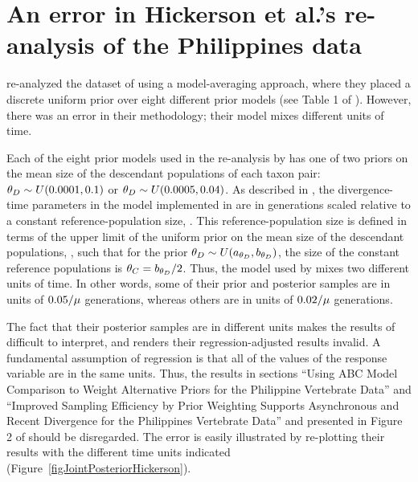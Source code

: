 \section{An error in Hickerson et al.'s re-analysis of the Philippines data}
\citet{Hickerson2013} re-analyzed the dataset of \citet{Oaks2012} using a
model-averaging approach, where they placed a discrete uniform prior over eight
different prior models (see Table 1 of \citet{Hickerson2013}).
However, there was an error in their methodology; their model mixes different
units of time.

Each of the eight prior models used in the re-analysis by \citet{Hickerson2013}
has one of two priors on the mean size of the descendant populations of each
taxon pair:
$\meanDescendantTheta{} \sim U(0.0001, 0.1)$ or
$\meanDescendantTheta{} \sim U(0.0005, 0.04)$.
As described in \citet{Oaks2012}, the divergence-time parameters in the model
implemented in \msb are in generations scaled relative to a constant
reference-population size, .
This reference-population size is defined in terms of the upper limit of the
uniform prior on the mean size of the descendant populations,
\meanDescendantTheta{}, such that for the prior $\meanDescendantTheta{} \sim
U(\uniformMin{\meanDescendantTheta{}},\uniformMax{\meanDescendantTheta{}})$,
the size of the constant reference populations is $\myTheta{C} =
\uniformMax{\meanDescendantTheta{}}/2$.
Thus, the model used by \citet{Hickerson2013} mixes two different units of
time.
In other words, some of their prior and posterior samples are in units of
$0.05/\mu$ generations, whereas others are in units of
$0.02/\mu$ generations.

The fact that their posterior samples are in different units makes the results
of \citet{Hickerson2013} difficult to interpret, and renders their
regression-adjusted results invalid.
A fundamental assumption of regression is that all of the values of the
response variable are in the same units.
Thus, the results in sections ``Using ABC Model Comparison to Weight
Alternative Priors for the Philippine Vertebrate Data'' and ``Improved Sampling
Efficiency by Prior Weighting Supports Asynchronous and Recent Divergence for
the Philippines Vertebrate Data'' and presented in Figure 2 of
\citet{Hickerson2013} should be disregarded.
The error is easily illustrated by re-plotting their results with the different
time units indicated (Figure~\ref{figJointPosteriorHickerson}).


